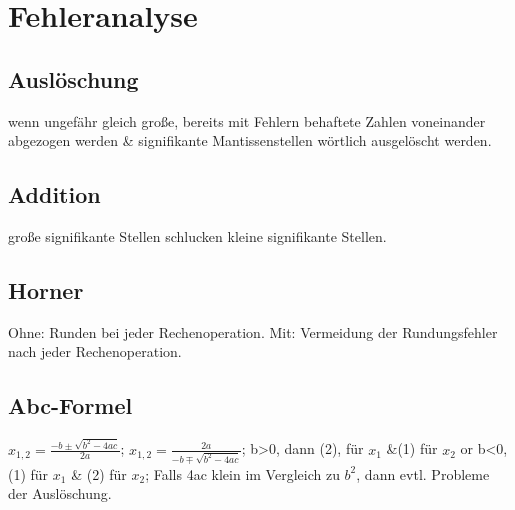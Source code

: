 \section{Fehleranalyse}
\subsection{Auslöschung}
wenn ungefähr gleich große, bereits mit Fehlern behaftete Zahlen voneinander abgezogen werden \& signifikante Mantissenstellen wörtlich ausgelöscht werden.
\subsection{Addition}
große signifikante Stellen schlucken kleine signifikante Stellen.
\subsection{Horner}
Ohne: Runden bei jeder Rechenoperation. Mit: Vermeidung der Rundungsfehler nach jeder Rechenoperation.
\subsection{Abc-Formel}
$ x_{1,2} = \frac{-b \pm \sqrt{b^2 - 4ac}}{2a} $; 
$ x_{1,2} = \frac{2a}{-b \mp \sqrt{b^2 -4ac}} $; 
b>0, dann (2), für $ x_1 $ \&(1) für $ x_2 $ or 
b<0, (1) für $x_{1} $ \& (2) für $ x_2 $;
Falls 4ac klein im Vergleich zu $ b^2$, dann evtl. Probleme der Auslöschung.